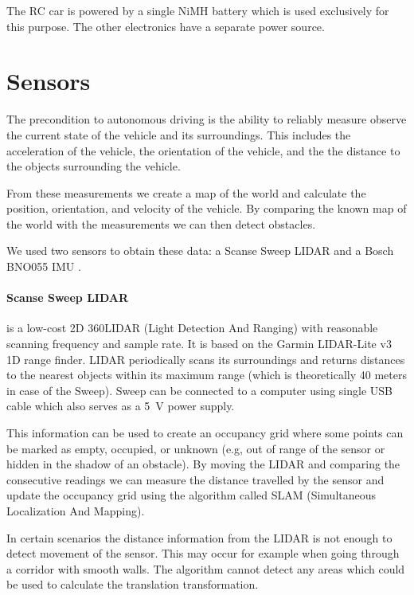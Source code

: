 The RC car is powered by a single NiMH battery which is used exclusively for this purpose. The other electronics have a separate power source.

\section{Sensors}

The precondition to autonomous driving is the ability to reliably measure observe the current state of the vehicle and its surroundings. This includes the acceleration of the vehicle, the orientation of the vehicle, and the the distance to the objects surrounding the vehicle.

From these measurements we create a map of the world and calculate the position, orientation, and velocity of the vehicle. By comparing the known map of the world with the measurements we can then detect obstacles.

We used two sensors to obtain these data: a Scanse Sweep LIDAR \cite{sweep} and a Bosch BNO055 IMU \cite{imu}.

\paragraph{Scanse Sweep LIDAR} is a low-cost 2D 360\textdegree LIDAR (Light Detection And Ranging) with reasonable scanning frequency and sample rate. It is based on the Garmin LIDAR-Lite v3 \cite{lidar-lite} 1D range finder. LIDAR periodically scans its surroundings and returns distances to the nearest objects within its maximum range (which is theoretically 40 meters in case of the Sweep). Sweep can be connected to a computer using single USB cable which also serves as a \SI{5}{V} power supply.

This information can be used to create an occupancy grid where some points can be marked as empty, occupied, or unknown (e.g, out of range of the sensor or hidden in the shadow of an obstacle). By moving the LIDAR and comparing the consecutive readings we can measure the distance travelled by the sensor and update the occupancy grid using the algorithm called SLAM (Simultaneous Localization And Mapping).

In certain scenarios the distance information from the LIDAR is not enough to detect movement of the sensor. This may occur for example when going through a corridor with smooth walls. The algorithm cannot detect any areas which could be used to calculate the translation transformation.

